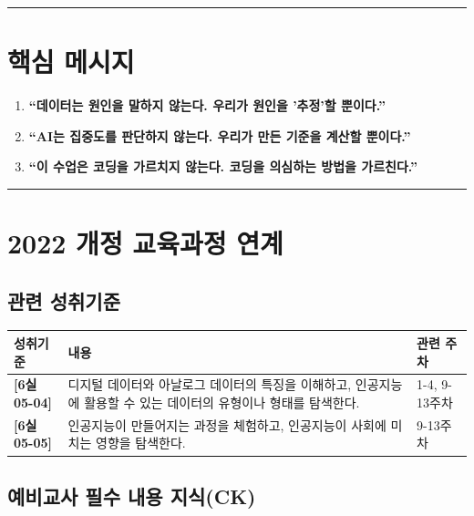 \documentclass[11pt, a4paper]{article}
\begin{document}
\vspace{3pt}
\noindent\rule{\textwidth}{0.3pt}

\section{핵심 메시지}

\begin{enumerate}[leftmargin=*, itemsep=3pt]
\item \textbf{``데이터는 원인을 말하지 않는다. 우리가 원인을 '추정'할 뿐이다.''}
\item \textbf{``AI는 집중도를 판단하지 않는다. 우리가 만든 기준을 계산할 뿐이다.''}
\item \textbf{``이 수업은 코딩을 가르치지 않는다. 코딩을 의심하는 방법을 가르친다.''}
\end{enumerate}

\vspace{3pt}
\noindent\rule{\textwidth}{0.3pt}

\section{2022 개정 교육과정 연계}

\subsection{관련 성취기준}

\begin{table}[H]
\centering
\begin{tabular}{|C{2cm}|L{9cm}|C{2.5cm}|}
\hline
{}
\textbf{성취기준} & \textbf{내용} & \textbf{관련 주차} \\
\hline
\textbf{[6실05-04]} & 디지털 데이터와 아날로그 데이터의 특징을 이해하고, 인공지능에 활용할 수 있는 데이터의 유형이나 형태를 탐색한다. & 1-4, 9-13주차 \\
\hline
\textbf{[6실05-05]} & 인공지능이 만들어지는 과정을 체험하고, 인공지능이 사회에 미치는 영향을 탐색한다. & 9-13주차 \\
\hline
\end{tabular}
\end{table}

\subsection{예비교사 필수 내용 지식(CK)}
\end{document}

